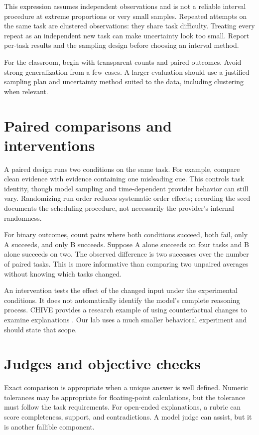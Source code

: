 This expression assumes independent observations and is not a reliable interval procedure at extreme proportions or very small samples. Repeated attempts on the same task are clustered observations: they share task difficulty. Treating every repeat as an independent new task can make uncertainty look too small. Report per-task results and the sampling design before choosing an interval method.

For the classroom, begin with transparent counts and paired outcomes. Avoid strong generalization from a few cases. A larger evaluation should use a justified sampling plan and uncertainty method suited to the data, including clustering when relevant.

\section{Paired comparisons and interventions}
A paired design runs two conditions on the same task. For example, compare clean evidence with evidence containing one misleading cue. This controls task identity, though model sampling and time-dependent provider behavior can still vary. Randomizing run order reduces systematic order effects; recording the seed documents the scheduling procedure, not necessarily the provider's internal randomness.

For binary outcomes, count pairs where both conditions succeed, both fail, only A succeeds, and only B succeeds. Suppose A alone succeeds on four tasks and B alone succeeds on two. The observed difference is two successes over the number of paired tasks. This is more informative than comparing two unpaired averages without knowing which tasks changed.

An intervention tests the effect of the changed input under the experimental conditions. It does not automatically identify the model's complete reasoning process. CHIVE provides a research example of using counterfactual changes to examine explanations \cite{chive}. Our lab uses a much smaller behavioral experiment and should state that scope.

\section{Judges and objective checks}
Exact comparison is appropriate when a unique answer is well defined. Numeric tolerances may be appropriate for floating-point calculations, but the tolerance must follow the task requirements. For open-ended explanations, a rubric can score completeness, support, and contradictions. A model judge can assist, but it is another fallible component.

